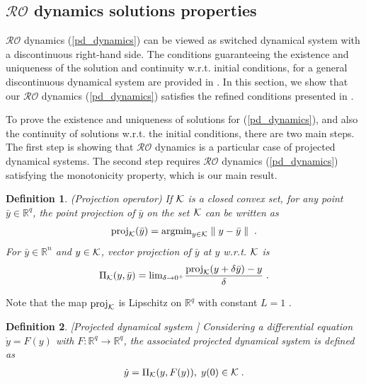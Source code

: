 \documentclass[journal,twoside,web]{ieeecolor}
\newtheorem{definition}{Definition}
\begin{document}
\subsection{$\mathcal{RO}$ dynamics solutions properties}\label{existence.sec}
$\mathcal{RO}$ dynamics (\ref{pd_dynamics}) can be viewed as switched dynamical system with a discontinuous right-hand side. The conditions guaranteeing the existence and uniqueness of the solution and continuity w.r.t. initial conditions, for a general discontinuous dynamical system are provided in \cite[Theorem~2.5]{nagurney2012projected}. In this section, we show that our $\mathcal{RO}$ dynamics (\ref{pd_dynamics}) satisfies the refined conditions presented in \cite{cherukuri2016}.

To prove the existence and uniqueness of solutions for (\ref{pd_dynamics}), and also the continuity of solutions w.r.t. the initial conditions, there are two main steps. The first step is showing that $\mathcal{RO}$ dynamics is a particular case of projected dynamical systems. The second step requires $\mathcal{RO}$ dynamics (\ref{pd_dynamics}) satisfying the monotonicity property, which is our main result.

\begin{definition} \label{projection_operator} (Projection operator)
If ${\cal K}$ is a closed convex set, for any point $\bar y \in \mathbb R^q$, the point projection of $\bar y$ on the set ${\cal K}$ can be written as
\begin{align*}
\text{proj}_{\cal K}(\bar y)=\text{argmin}_{y \in {\cal K}} \parallel y-\bar y \parallel\;.
\end{align*}
For $\bar y \in \mathbb R^n$ and $y \in {\cal K}$, vector projection of $\bar y$ at $y$ w.r.t. ${\cal K}$ is
\begin{align}
\label{projection_operator}
\Pi_{\cal K}(y,\bar y) = \text{lim}_{\delta \rightarrow 0^+} \frac{\text{proj}_{\cal K}(y+\delta \bar y)-y}{\delta}\;.
\end{align}
\end{definition}

Note that the map $\text{proj}_{\cal K}$ is Lipschitz on $\mathbb R^q$ with constant $L=1$ \cite[Proposition~2.4.1]{clarke1983}.

\begin{definition} \label{projected_dynamical_system} [Projected dynamical system \cite{nagurney1996}]
Considering a differential equation $\dot y=F(y)$ with $F:\mathbb R^q \rightarrow \mathbb R^q$, the associated projected dynamical system is defined as
\begin{align}
\label{projected_dynamics}
\dot y = \Pi_{\cal K}(y,F(y)),\; y(0) \in {\cal K}\;.
\end{align}
\end{definition}
\end{document}
